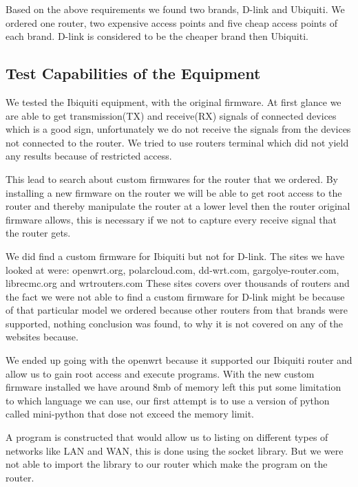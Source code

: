 Based on the above requirements we found two brands, D-link and Ubiquiti. We ordered one router, two expensive access points and five cheap access points of each brand. D-link is considered to be the cheaper brand then Ubiquiti.

\subsection*{Test Capabilities of the Equipment}
We tested the Ibiquiti equipment, with the original firmware. At first glance we are able to get transmission(TX) and receive(RX) signals of connected devices which is a good sign, unfortunately we do not receive the signals from the devices not connected to the router. We tried to use routers terminal which did not yield any results because of restricted access.

This lead to search about custom firmwares for the router that we ordered. By installing a new firmware on the router we will be able to get root access to the router and thereby manipulate the router at a lower level then the router original firmware allows, this is necessary if we not to capture every receive signal that the router gets.

We did find a custom firmware for Ibiquiti but not for D-link. The sites we have looked at were: openwrt.org, polarcloud.com, dd-wrt.com, gargolye-router.com, librecmc.org and wrtrouters.com These sites covers over thousands of routers and the fact we were not able to find a custom firmware for D-link might be because of that particular model we ordered because other routers from that brands were supported, nothing conclusion was found, to why it is not covered on any of the websites because.

We ended up going with the openwrt because it supported our Ibiquiti router and allow us to gain root access and execute programs. With the new custom firmware installed we have around 8mb of memory left this put some limitation to which language we can use, our first attempt is to use a version of python called mini-python that dose not exceed the memory limit.

A program is constructed that would allow us to listing on different types of networks like LAN and WAN, this is done using the socket library. But we were not able to import the library to our router which make the program on the router.